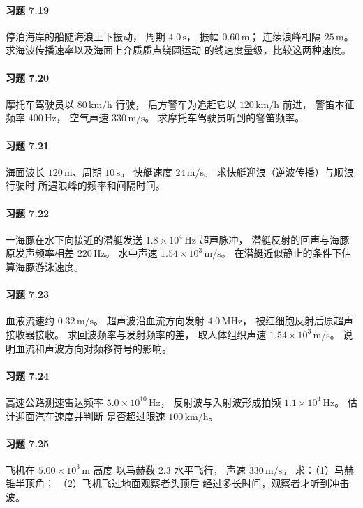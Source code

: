 \paragraph{习题 7.19}
停泊海岸的船随海浪上下振动，
周期
\(4.0\,\mathrm s\)，
振幅 \(0.60\,\mathrm m\)；
连续浪峰相隔
\(25\,\mathrm m\)。
求海波传播速率以及海面上介质质点绕圆运动
的线速度量级，比较这两种速度。

\paragraph{习题 7.20}
摩托车驾驶员以
\(80\,\mathrm{km/h}\) 行驶，
后方警车为追赶它以
\(120\,\mathrm{km/h}\) 前进，
警笛本征频率 \(400\,\mathrm{Hz}\)，
空气声速
\(330\,\mathrm{m/s}\)。
求摩托车驾驶员听到的警笛频率。

\paragraph{习题 7.21}
海面波长
\(120\,\mathrm m\)、周期
\(10\,\mathrm s\)。
快艇速度
\(24\,\mathrm{m/s}\)。
求快艇迎浪（逆波传播）与顺浪行驶时
所遇浪峰的频率和间隔时间。

\paragraph{习题 7.22}
一海豚在水下向接近的潜艇发送
\(1.8\times10^4\,\mathrm{Hz}\)
超声脉冲，
潜艇反射的回声与海豚原发声频率相差
\(220\,\mathrm{Hz}\)。
水中声速
\(1.54\times10^3\,\mathrm{m/s}\)。
在潜艇近似静止的条件下估算海豚游泳速度。

\paragraph{习题 7.23}
血液流速约
\(0.32\,\mathrm{m/s}\)。
超声波沿血流方向发射
\(4.0\,\mathrm{MHz}\)，
被红细胞反射后原超声接收器接收。
求回波频率与发射频率的差，
取人体组织声速
\(1.54\times10^3\,\mathrm{m/s}\)。
说明血流和声波方向对频移符号的影响。

\paragraph{习题 7.24}
高速公路测速雷达频率
\(5.0\times10^{10}\,\mathrm{Hz}\)，
反射波与入射波形成拍频
\(1.1\times10^4\,\mathrm{Hz}\)。
估计迎面汽车速度并判断
是否超过限速
\(100\,\mathrm{km/h}\)。

\paragraph{习题 7.25}
飞机在
\(5.00\times10^3\,\mathrm m\) 高度
以马赫数 \(2.3\) 水平飞行，
声速 \(330\,\mathrm{m/s}\)。
求：（1）马赫锥半顶角；
（2）飞机飞过地面观察者头顶后
经过多长时间，观察者才听到冲击波。

